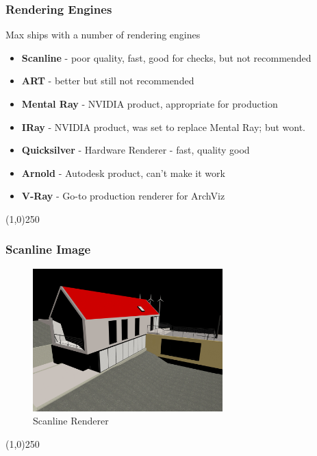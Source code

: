 \begin{frame}
\frametitle{Rendering Engines}
Max ships with a number of rendering engines
\begin{itemize}
	\item \textbf{Scanline} - poor quality, fast, good for checks, but not recommended
	\item \textbf{ART} - better but still not recommended
	\item \textbf{Mental Ray} - NVIDIA product, appropriate for production
	\item \textbf{IRay} - NVIDIA product, was set to replace Mental Ray; but wont.
	\item \textbf{Quicksilver} - Hardware Renderer - fast, quality good
	\item \textbf{Arnold} - Autodesk product, can't make it work
	\item \textbf{V-Ray} - Go-to production renderer for ArchViz
\end{itemize}
\end{frame}
\begin{center}\line(1,0){250}\end{center}



\begin{frame}
\frametitle{Scanline Image}
\begin{figure}
	\centering
		\includegraphics[height=5.5cm]{img/Rendering/scanline.jpg}
	\caption{Scanline Renderer}
	\label{fig:Scanline}
\end{figure}
\end{frame}
\begin{center}\line(1,0){250}\end{center}



